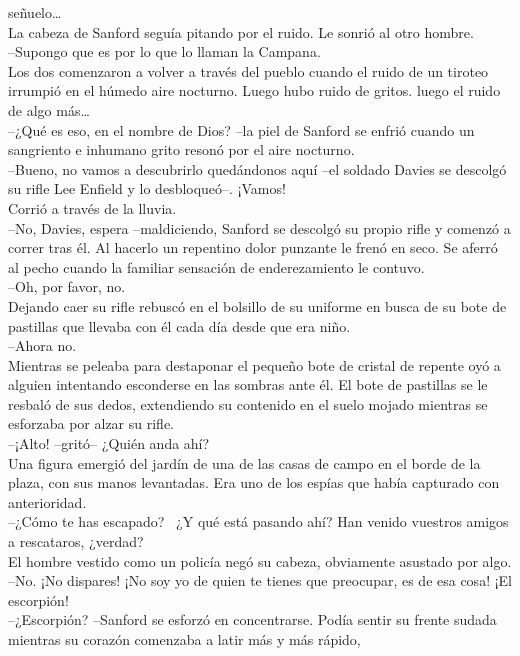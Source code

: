 señuelo\ldots{}\\
La cabeza de Sanford seguía pitando por el ruido. Le sonrió al otro
hombre.\\
--Supongo que es por lo que lo llaman la Campana.\\
Los dos comenzaron a volver a través del pueblo cuando el ruido de un
tiroteo irrumpió en el húmedo aire nocturno. Luego hubo ruido de gritos.
luego el ruido de algo más\ldots{}\\
--¿Qué es eso, en el nombre de Dios? --la piel de Sanford se enfrió
cuando un sangriento e inhumano grito resonó por el aire nocturno.\\
--Bueno, no vamos a descubrirlo quedándonos aquí --el soldado Davies se
descolgó su rifle Lee Enfield y lo desbloqueó--. ¡Vamos!\\
Corrió a través de la lluvia.\\
--No, Davies, espera --maldiciendo, Sanford se descolgó su propio rifle
y comenzó a correr tras él. Al hacerlo un repentino dolor punzante le
frenó en seco. Se aferró al pecho cuando la familiar sensación de
enderezamiento le contuvo.\\
--Oh, por favor, no.\\
Dejando caer su rifle rebuscó en el bolsillo de su uniforme en busca de
su bote de pastillas que llevaba con él cada día desde que era niño.\\
--Ahora no.\\
Mientras se peleaba para destaponar el pequeño bote de cristal de
repente oyó a alguien intentando esconderse en las sombras ante él. El
bote de pastillas se le resbaló de sus dedos, extendiendo su contenido
en el suelo mojado mientras se esforzaba por alzar su rifle.\\
--¡Alto! --gritó-- ¿Quién anda ahí?\\
Una figura emergió del jardín de una de las casas de campo en el borde
de la plaza, con sus manos levantadas. Era uno de los espías que había
capturado con anterioridad.\\
--¿Cómo te has escapado? ~¿Y qué está pasando ahí? Han venido vuestros
amigos a rescataros, ¿verdad?\\
El hombre vestido como un policía negó su cabeza, obviamente asustado
por algo.\\
--No. ¡No dispares! ¡No soy yo de quien te tienes que preocupar, es de
esa cosa! ¡El escorpión!\\
--¿Escorpión? --Sanford se esforzó en concentrarse. Podía sentir su
frente sudada mientras su corazón comenzaba a latir más y más rápido,
